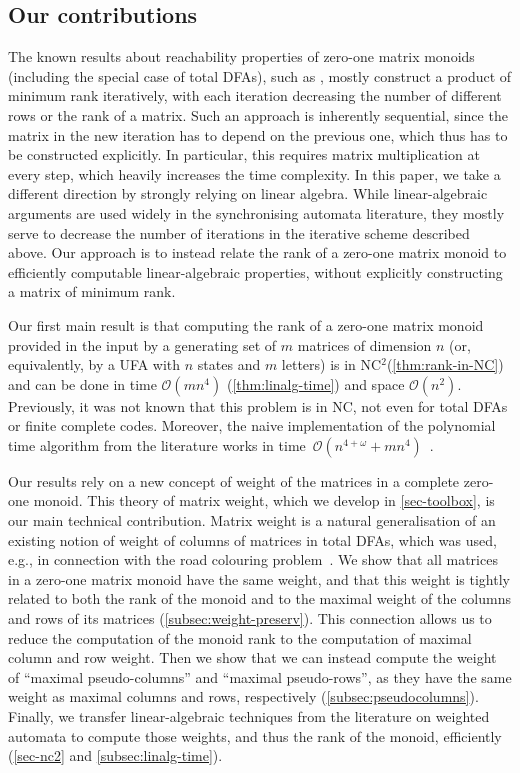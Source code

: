 \documentclass[11pt,a4paper]{amsart}
\newcommand{\OO}{\mathcal{O}}
\newcommand{\NCT}{\textnormal{\textsf{NC$^2$}}\xspace}
\newcommand{\NC}{\textnormal{\textsf{NC}}\xspace}
\theoremstyle{plain}
\theoremstyle{definition}
\theoremstyle{defC}
\theoremstyle{thmC}
\theoremstyle{plain}
\numberwithin{equation}{section}
\begin{document}
\subsection{Our contributions}
The known results about reachability properties of zero-one matrix monoids (including the special case of total DFAs), such as \cite{Carpi1988,Eppstein1990,Ryzhikov2019WORDS,Kiefer2021}, mostly construct a product of minimum rank iteratively, with each iteration decreasing the number of different rows or the rank of a matrix.
Such an approach is inherently sequential, since the matrix in the new iteration has to depend on the previous one, which thus has to be constructed explicitly.
In particular, this requires matrix multiplication at every step, which heavily increases the time complexity. In this paper, we take a different direction by strongly relying on linear algebra. While linear-algebraic arguments are used widely in the synchronising automata literature, they mostly serve to decrease the number of iterations in the iterative scheme described above. Our approach is to instead relate the rank of a zero-one matrix monoid to efficiently computable linear-algebraic properties, without explicitly constructing a matrix of minimum rank.

Our first main result is that computing the rank of a zero-one matrix monoid provided in the input by a generating set of $m$ matrices of dimension $n$ (or, equivalently, by a UFA with $n$ states and $m$ letters) is in \NCT (\autoref{thm:rank-in-NC}) and can be done in time $\OO(mn^4)$ (\autoref{thm:linalg-time}) and space $\OO(n^2)$. Previously, it was not known that this problem is in \NC, not even for total DFAs or finite complete codes. Moreover, the naive implementation of the polynomial time algorithm from the literature works in time~$\OO(n^{4 + \omega} + mn^4)$~\cite{Carpi1988}.

Our results rely on a new concept of weight of the matrices in a complete zero-one monoid.
This theory of matrix weight, which we develop in \cref{sec-toolbox}, is our main technical contribution.
Matrix weight is a natural generalisation of an existing notion of weight of columns of matrices in total DFAs, which was used, e.g., in connection with the road colouring problem~\cite{Friedman1990,Kari2001,Gusev2016}.
We show that all matrices in a zero-one matrix monoid have the same weight, and that this weight is tightly related to both the rank of the monoid and to the maximal weight of the columns and rows of its matrices (\autoref{subsec:weight-preserv}).
This connection allows us to reduce the computation of the monoid rank to the computation of maximal column and row weight.
Then we show that we can instead compute the weight of ``maximal pseudo-columns'' and ``maximal pseudo-rows'', as they have the same weight as maximal columns and rows, respectively (\autoref{subsec:pseudocolumns}).
Finally, we transfer linear-algebraic techniques from the literature on weighted automata to compute those weights, and thus the rank of the monoid, efficiently (\autoref{sec-nc2} and \autoref{subsec:linalg-time}).
\end{document}
